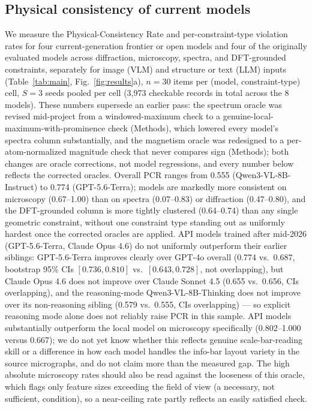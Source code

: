 \documentclass[pdflatex,sn-nature]{sn-jnl}
\begin{document}
\subsection*{Physical consistency of current models}
We measure the Physical-Consistency Rate and per-constraint-type violation rates for
four current-generation frontier or open models and four of the originally evaluated
models across diffraction, microscopy, spectra, and
DFT-grounded constraints, separately for image (VLM) and structure or text (LLM)
inputs (Table~\ref{tab:main}, Fig.~\ref{fig:results}a), $n=30$ items per (model, constraint-type) cell, $S=3$ seeds
pooled per cell (3{,}973 checkable records in total across the 8 models). These numbers
supersede an earlier pass: the spectrum oracle was revised mid-project from a
windowed-maximum check to a genuine-local-maximum-with-prominence check (Methods), which
lowered every model's spectra column substantially, and the magnetism oracle was
redesigned to a per-atom-normalized magnitude check that never compares sign (Methods);
both changes are oracle corrections, not model regressions, and every number below
reflects the corrected oracles. Overall PCR ranges from 0.555
(Qwen3-VL-8B-Instruct) to 0.774 (GPT-5.6-Terra); models are
markedly more consistent on microscopy (0.67--1.00) than on spectra (0.07--0.83) or
diffraction (0.47--0.80), and the DFT-grounded column is more tightly clustered
(0.64--0.74) than any single geometric constraint, without one constraint type standing
out as uniformly hardest once the corrected oracles are applied. API models trained after mid-2026 (GPT-5.6-Terra, Claude Opus 4.6) do not
uniformly outperform their earlier siblings: GPT-5.6-Terra improves clearly over GPT-4o
overall (0.774 vs.\ 0.687, bootstrap 95\% CIs $[0.736,0.810]$ vs.\ $[0.643,0.728]$, not
overlapping), but Claude Opus 4.6 does not improve over Claude Sonnet 4.5 (0.655 vs.\
0.656, CIs overlapping), and the reasoning-mode Qwen3-VL-8B-Thinking does not improve over
its non-reasoning sibling (0.579 vs.\ 0.555, CIs overlapping) --- so explicit reasoning
mode alone does not reliably raise PCR in this sample. API models substantially outperform the local model on
microscopy specifically (0.802--1.000 versus 0.667); we do not yet know whether this
reflects genuine scale-bar-reading skill or a difference in how each model handles the
info-bar layout variety in the source micrographs, and do not claim more than the
measured gap. The high absolute microscopy rates should also be read against the
looseness of this oracle, which flags only feature sizes exceeding the field of view (a
necessary, not sufficient, condition), so a near-ceiling rate partly reflects an easily
satisfied check.
\end{document}
